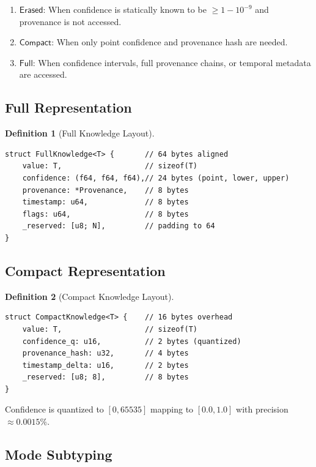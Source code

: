 \documentclass[11pt]{article}
\newtheorem{definition}{Definition}
\newcommand{\Full}{\mathsf{Full}}
\newcommand{\Compact}{\mathsf{Compact}}
\newcommand{\Erased}{\mathsf{Erased}}
\begin{document}
\begin{enumerate}
\item $\Erased$: When confidence is statically known to be $\geq 1 - 10^{-9}$
      and provenance is not accessed.
\item $\Compact$: When only point confidence and provenance hash are needed.
\item $\Full$: When confidence intervals, full provenance chains, or temporal
      metadata are accessed.
\end{enumerate}

\subsection{Full Representation}

\begin{definition}[Full Knowledge Layout]
\begin{verbatim}
struct FullKnowledge<T> {       // 64 bytes aligned
    value: T,                   // sizeof(T)
    confidence: (f64, f64, f64),// 24 bytes (point, lower, upper)
    provenance: *Provenance,    // 8 bytes
    timestamp: u64,             // 8 bytes
    flags: u64,                 // 8 bytes
    _reserved: [u8; N],         // padding to 64
}
\end{verbatim}
\end{definition}

\subsection{Compact Representation}

\begin{definition}[Compact Knowledge Layout]
\begin{verbatim}
struct CompactKnowledge<T> {    // 16 bytes overhead
    value: T,                   // sizeof(T)
    confidence_q: u16,          // 2 bytes (quantized)
    provenance_hash: u32,       // 4 bytes
    timestamp_delta: u16,       // 2 bytes
    _reserved: [u8; 8],         // 8 bytes
}
\end{verbatim}
\end{definition}

Confidence is quantized to $[0, 65535]$ mapping to $[0.0, 1.0]$ with
precision $\approx 0.0015\%$.

\subsection{Mode Subtyping}
\end{document}
